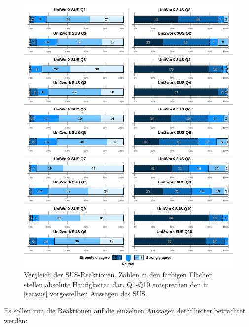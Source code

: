 \documentclass[11pt,a4paper,twoside,ngerman]{article}
\begin{document}
\begin{figure}[H]
    \centering
    \includegraphics[width=\textwidth]{images/likert_comparison.jpg}
    \caption{Vergleich der SUS-Reaktionen. Zahlen in den farbigen Flächen stellen absolute Häufigkeiten dar. Q1-Q10 entsprechen den in \autoref{sec:sus} vorgestellten Aussagen des SUS.}
    \label{fig:results_sus}
\end{figure}

\noindent
Es sollen nun die Reaktionen auf die einzelnen Aussagen detaillierter betrachtet werden:
\end{document}
